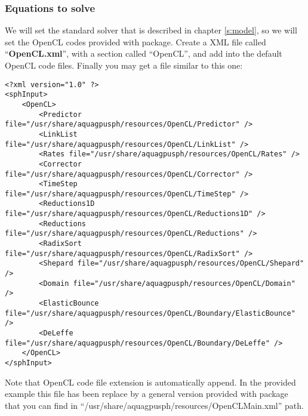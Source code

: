 \subsubsection{Equations to solve}
\label{sss:example:lateral_water_1x_deleffe:equations}
%
We will set the standard \NAME solver that is described in chapter \ref{s:model}, so we will set the OpenCL codes
provided with \NAME package. Create a XML file called ``\textbf{OpenCL.xml}'', with a section called ``OpenCL'',
and add into the default OpenCL code files. Finally you may get a file similar to this one:
%
\begin{verbatim}
<?xml version="1.0" ?>
<sphInput>
	<OpenCL>
		<Predictor file="/usr/share/aquagpusph/resources/OpenCL/Predictor" />
		<LinkList file="/usr/share/aquagpusph/resources/OpenCL/LinkList" />
		<Rates file="/usr/share/aquagpusph/resources/OpenCL/Rates" />
		<Corrector file="/usr/share/aquagpusph/resources/OpenCL/Corrector" />
		<TimeStep file="/usr/share/aquagpusph/resources/OpenCL/TimeStep" />
		<Reductions1D file="/usr/share/aquagpusph/resources/OpenCL/Reductions1D" />
		<Reductions file="/usr/share/aquagpusph/resources/OpenCL/Reductions" />
		<RadixSort file="/usr/share/aquagpusph/resources/OpenCL/RadixSort" />
		<Shepard file="/usr/share/aquagpusph/resources/OpenCL/Shepard" />
		<Domain file="/usr/share/aquagpusph/resources/OpenCL/Domain" />
		<ElasticBounce file="/usr/share/aquagpusph/resources/OpenCL/Boundary/ElasticBounce" />
		<DeLeffe file="/usr/share/aquagpusph/resources/OpenCL/Boundary/DeLeffe" />
	</OpenCL>
</sphInput>
\end{verbatim}
%
Note that OpenCL code file extension is automatically append. In the provided example this file has been replace by
a general version provided with \NAME package that you can find in
``/usr/share/aquagpusph/resources/OpenCLMain.xml'' path.
%
